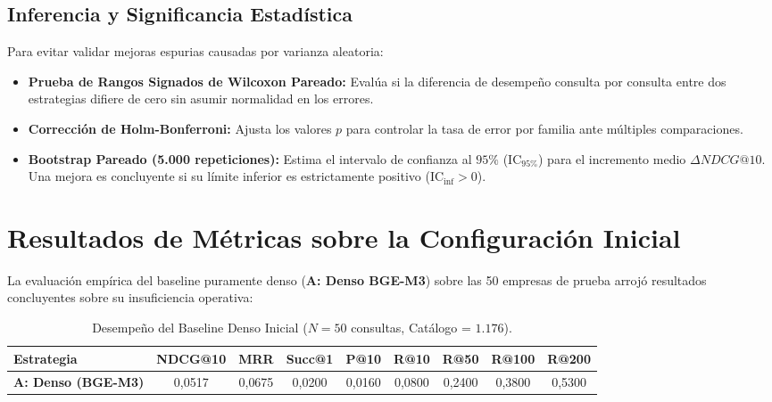 \documentclass[11pt,a4paper]{article}
\begin{document}
\subsection{Inferencia y Significancia Estadística}
Para evitar validar mejoras espurias causadas por varianza aleatoria:
\begin{itemize}[leftmargin=*]
    \item \textbf{Prueba de Rangos Signados de Wilcoxon Pareado:} Evalúa si la diferencia de desempeño consulta por consulta entre dos estrategias difiere de cero sin asumir normalidad en los errores.
    \item \textbf{Corrección de Holm-Bonferroni:} Ajusta los valores $p$ para controlar la tasa de error por familia ante múltiples comparaciones.
    \item \textbf{Bootstrap Pareado (5.000 repeticiones):} Estima el intervalo de confianza al $95\%$ ($\text{IC}_{95\%}$) para el incremento medio $\Delta NDCG@10$. Una mejora es concluyente si su límite inferior es estrictamente positivo ($\text{IC}_{\text{inf}} > 0$).
\end{itemize}

\section{Resultados de Métricas sobre la Configuración Inicial}

La evaluación empírica del baseline puramente denso (\textbf{A: Denso BGE-M3}) sobre las 50 empresas de prueba arrojó resultados concluyentes sobre su insuficiencia operativa:

\begin{table}[htbp]
\centering
\small
\caption{Desempeño del Baseline Denso Inicial ($N=50$ consultas, Catálogo = $1.176$).}
\label{tab:baseline_inicial}
\begin{tabularx}{\textwidth}{lcccccccc}
\toprule
\textbf{Estrategia} & \textbf{NDCG@10} & \textbf{MRR} & \textbf{Succ@1} & \textbf{P@10} & \textbf{R@10} & \textbf{R@50} & \textbf{R@100} & \textbf{R@200} \\
\midrule
\textbf{A: Denso (BGE-M3)} & 0{,}0517 & 0{,}0675 & 0{,}0200 & 0{,}0160 & 0{,}0800 & 0{,}2400 & 0{,}3800 & 0{,}5300 \\
\bottomrule
\end{tabularx}
\end{table}
\end{document}
